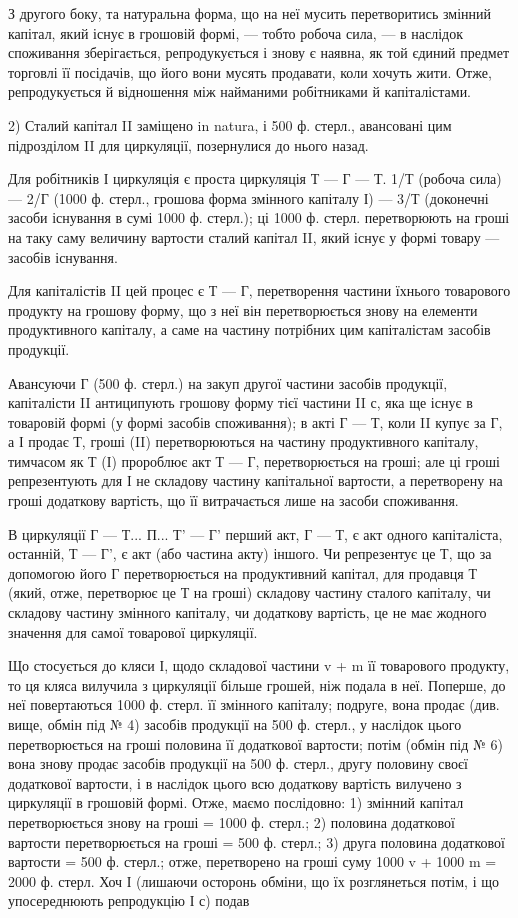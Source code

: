 З другого боку, та натуральна форма, що на неї мусить перетворитись
змінний капітал, який існує в грошовій формі, — тобто робоча сила, —
в наслідок споживання зберігається, репродукується і знову є наявна,
як той єдиний предмет торговлі її посідачів, що його вони мусять продавати,
коли хочуть жити. Отже, репродукується й відношення між найманими
робітниками й капіталістами.

2) Сталий капітал II заміщено in natura, і 500 ф. стерл., авансовані
цим підрозділом II для циркуляції, позернулися до нього назад.

Для робітників І циркуляція є проста циркуляція Т — Г — Т. 1/Т (робоча
сила) — 2/Г (1000 ф. стерл., грошова форма змінного капіталу І) — 3/Т
(доконечні засоби існування в сумі 1000 ф. стерл.); ці 1000 ф. стерл.
перетворюють на гроші на таку саму величину вартости сталий капітал II,
який існує у формі товару — засобів існування.

Для капіталістів II цей процес є Т — Г, перетворення частини їхнього
товарового продукту на грошову форму, що з неї він перетворюється
знову на елементи продуктивного капіталу, а саме на частину потрібних
цим капіталістам засобів продукції.

Авансуючи Г (500 ф. стерл.) на закуп другої частини засобів продукції,
капіталісти II антиципують грошову форму тієї частини II с, яка
ще існує в товаровій формі (у формі засобів споживання); в акті Г — Т,
коли II купує за Г, а І продає Т, гроші (II) перетворюються на частину
продуктивного капіталу, тимчасом як Т (І) пророблює акт Т — Г, перетворюється
на гроші; але ці гроші репрезентують для І не складову частину
капітальної вартости, а перетворену на гроші додаткову вартість, що її
витрачається лише на засоби споживання.

В циркуляції Г — Т... П... Т' — Г' перший акт, Г — Т, є акт одного капіталіста,
останній, Т — Г', є акт (або частина акту) іншого. Чи репрезентує
це Т, що за допомогою його Г перетворюється на продуктивний капітал,
для продавця Т (який, отже, перетворює це Т на гроші) складову частину
сталого капіталу, чи складову частину змінного капіталу, чи додаткову
вартість, це не має жодного значення для самої товарової циркуляції.

Що стосується до кляси І, щодо складової частини v + m її товарового
продукту, то ця кляса вилучила з циркуляції більше грошей, ніж подала
в неї. Поперше, до неї повертаються 1000 ф. стерл. її змінного капіталу;
подруге, вона продає (див. вище, обмін під № 4) засобів продукції
на 500 ф. стерл., у наслідок цього перетворюється на гроші половина
її додаткової вартости; потім (обмін під № 6) вона знову продає засобів
продукції на 500 ф. стерл., другу половину своєї додаткової вартости,
і в наслідок цього всю додаткову вартість вилучено з циркуляції в грошовій
формі. Отже, маємо послідовно: 1) змінний капітал перетворюється
знову на гроші = 1000 ф. стерл.; 2) половина додаткової вартости перетворюється
на гроші = 500 ф. стерл.; 3) друга половина додаткової
вартости = 500 ф. стерл.; отже, перетворено на гроші суму
1000 v + 1000 m = 2000 ф. стерл. Хоч І (лишаючи осторонь обміни,
що їх розглянеться потім, і що упосереднюють репродукцію І с) подав
\parbreak{}  %
